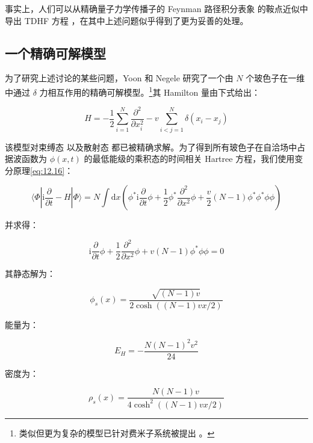 事实上，人们可以从精确量子力学传播子的 Feynman 路径积分表象 \cite{FH65} 的鞍点近似中导出 TDHF 方程 \cite{KI77,ER78,NLP79,Re79}，在其中上述问题似乎得到了更为妥善的处理。

\subsection{一个精确可解模型\label{subsec:12.2.5}}

为了研究上述讨论的某些问题，Yoon 和 Negele \cite{YN77} 研究了一个由 $N$ 个玻色子在一维中通过 $\delta$
力相互作用的精确可解模型。\footnote{类似但更为复杂的模型已针对费米子系统被提出 \cite{NW76a,NW78}。}其
Hamilton 量由下式给出：

\begin{equation}
H=-\frac{1}{2}\sum^{N}_{i=1}\frac{\partial^{2}}{\partial x^{2}_{i}}-v\sum^{N}_{i<j=1}\delta(x_{i}-x_{j})\label{eq:12.46}
\end{equation}

该模型对束缚态 \cite{Be31,Mc65} 以及散射态 \cite{Ya67} 都已被精确求解。为了得到所有玻色子在自洽场中占据波函数为
$\phi(x,t)$ 的最低能级的乘积态的时间相关 Hartree 方程，我们使用变分原理\ref{eq:12.16}：

\begin{equation}
\langle\Phi|\mathrm{i}\frac{\partial}{\partial t}-H|\Phi\rangle=N\int\mathrm{d}x\left(\phi^{*}\mathrm{i}\frac{\partial}{\partial t}\phi+\frac{1}{2}\phi^{*}\frac{\partial^{2}}{\partial x^{2}}\phi+\frac{v}{2}(N-1)\phi^{*}\phi^{*}\phi\phi\right)\label{eq:12.47}
\end{equation}

并求得：

\begin{equation}
\mathrm{i}\frac{\partial}{\partial t}\phi+\frac{1}{2}\frac{\partial^{2}}{\partial x^{2}}\phi+v(N-1)\phi^{*}\phi\phi=0\label{eq:12.48}
\end{equation}

其静态解为：

\begin{equation}
\phi_{s}(x)=\frac{\sqrt{(N-1)v}}{2\cosh((N-1)vx/2)}\label{eq:12.49}
\end{equation}

能量为：

\begin{equation}
E_{H}=-\frac{N(N-1)^{2}v^{2}}{24}\label{eq:12.50}
\end{equation}

密度为：

\begin{equation}
\rho_{s}(x)=\frac{N(N-1)v}{4\cosh^{2}((N-1)vx/2)}\label{eq:12.51}
\end{equation}

